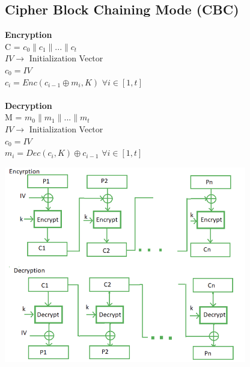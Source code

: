 \documentclass[11pt]{article}
\begin{document}
\subsection*{Cipher Block Chaining Mode (CBC)}
\textbf{Encryption} \\
C = $c_{0} \| c_{1} \| ... \| c_{t}$ \\
$IV \rightarrow$ Initialization Vector \\
$c_{0} = IV $ \\
$c_{i} = Enc(c_{i-1} \oplus m_{i},K)$ \hspace{1cm} $\forall i\in [1,t]$ \\\\
\textbf{Decryption} \\
M = $m_{0} \| m_{1} \| ... \| m_{t}$ \\
$IV \rightarrow$ Initialization Vector \\
$c_{0} = IV $ \\
$m_{i} = Dec(c_{i},K) \oplus c_{i-1}$ \hspace{1cm} $\forall i\in [1,t]$ \\
\begin{center}
\includegraphics[width=300pt]{p2.png} \\  
\end{center}
\end{document}
